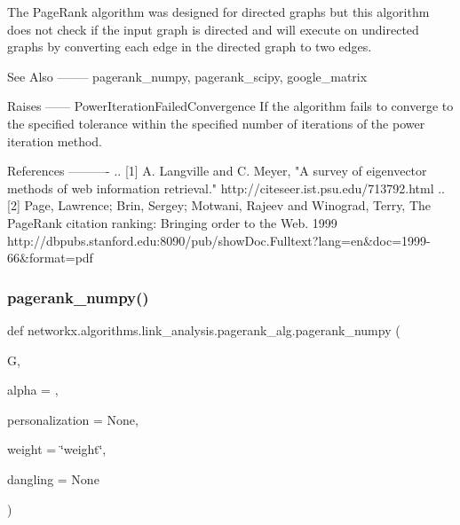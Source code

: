 \begin{DoxyVerb}
The PageRank algorithm was designed for directed graphs but this
algorithm does not check if the input graph is directed and will
execute on undirected graphs by converting each edge in the
directed graph to two edges.

See Also
--------
pagerank_numpy, pagerank_scipy, google_matrix

Raises
------
PowerIterationFailedConvergence
    If the algorithm fails to converge to the specified tolerance
    within the specified number of iterations of the power iteration
    method.

References
----------
.. [1] A. Langville and C. Meyer,
   "A survey of eigenvector methods of web information retrieval."
   http://citeseer.ist.psu.edu/713792.html
.. [2] Page, Lawrence; Brin, Sergey; Motwani, Rajeev and Winograd, Terry,
   The PageRank citation ranking: Bringing order to the Web. 1999
   http://dbpubs.stanford.edu:8090/pub/showDoc.Fulltext?lang=en&doc=1999-66&format=pdf\end{DoxyVerb}
 \mbox{\label{namespacenetworkx_1_1algorithms_1_1link__analysis_1_1pagerank__alg_a1497a95c921c7d781b592798eb0156d5}} 
\subsubsection{\texorpdfstring{pagerank\+\_\+numpy()}{pagerank\_numpy()}}
{\footnotesize\ttfamily def networkx.\+algorithms.\+link\+\_\+analysis.\+pagerank\+\_\+alg.\+pagerank\+\_\+numpy (\begin{DoxyParamCaption}\item[{}]{G,  }\item[{}]{alpha = {},  }\item[{}]{personalization = {\ttfamily None},  }\item[{}]{weight = {\ttfamily \char`\"{}weight\char`\"{}},  }\item[{}]{dangling = {\ttfamily None} }\end{DoxyParamCaption})}

